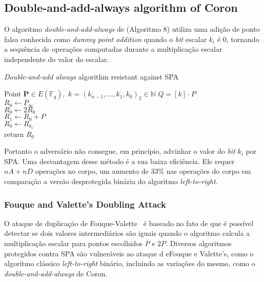 
\subsection{Double-and-add-always algorithm of Coron~\cite{Coron1999}}

\begin{comment}
\erick[inline]{Lucas: traduzir esta secao}
\end{comment}

O algoritmo {\it double-and-add-always} de \cite{Coron1999} (Algoritmo 8) utiliza uma adição de ponto falsa conhecida como \textit{dummy point addition} quando o \textit{bit} escalar $k_i$ é $0$, tornando a sequência de operações computadas durante a multiplicação escalar independente do valor do escalar.

\begin{algorithm}[h] %
	\caption{\small{\textit{Double-and-add always} algorithm resistant against SPA}}
	\label{Double-and-add-Coron}
	\begin{algorithmic}[1]
		\REQUIRE  Point $\textbf{P} \in E(\mathbb{F}_q),$ $k=(k_{n-1},\ldots,k_1,k_0)_2 \in \mathbb{N}$
		\ENSURE  $Q=[k] \cdot P$\\
		\STATE $R_0\leftarrow P_{\infty}$   \\
		\STATE $R_0\leftarrow 2R_0$  \\
		\STATE $R_1\leftarrow R_0+P$\\ \label{Paso_R_1_Double-and-add-Coron}
		\STATE $R_0\leftarrow R_{k_i}$\label{Step5Double-and-add-Coron} \\
		\ENDFOR
		\STATE return $R_0$\\
	\end{algorithmic}
\end{algorithm}

Portanto o adversário não consegue, em princípio, advinhar o valor do \textit{bit} $k_i$ por SPA. Uma desvantagem desse método é a sua baixa eficiência. Ele requer $nA + nD$ operações no corpo, um aumento de $33\%$ nas operações do corpo em comparação a versão desprotegida binária do algoritmo \textit{left-to-right}.

\subsubsection{Fouque and Valette's Doubling Attack \cite{CHES:FouVal03}}\label{Fouque-Valette-DoublingAttack}
O ataque de duplicação de Fouque-Valette~\cite{CHES:FouVal03} é baseado no fato de que é possível detectar se dois valores intermediários são iguais quando o algoritmo calcula a multiplicação escalar para pontos escolhidos $P$ e $2P$. Diversos algoritmos protegidos contra SPA são vulneráveis ao ataque d eFouque e Valette's, como o algoritmo clássico \textit{left-to-right} binário, incluindo as variações do mesmo, como o \textit{double-and-add-always} de Coron.

